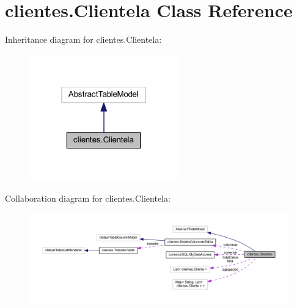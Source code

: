 \hypertarget{classclientes_1_1_clientela}{}\section{clientes.\+Clientela Class Reference}
\label{classclientes_1_1_clientela}


Inheritance diagram for clientes.\+Clientela\+:\nopagebreak
\begin{figure}[H]
\begin{center}
\leavevmode
\includegraphics[width=183pt]{classclientes_1_1_clientela__inherit__graph}
\end{center}
\end{figure}


Collaboration diagram for clientes.\+Clientela\+:\nopagebreak
\begin{figure}[H]
\begin{center}
\leavevmode
\includegraphics[width=350pt]{classclientes_1_1_clientela__coll__graph}
\end{center}
\end{figure}
